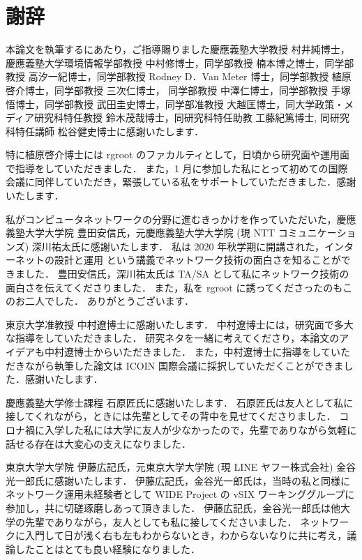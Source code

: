 \chapter*{謝辞}
\label{thanks}
本論文を執筆するにあたり，ご指導賜りました慶應義塾大学教授 村井純博士，慶應義塾大学環境情報学部教授 中村修博士，同学部教授 楠本博之博士，同学部教授 高汐一紀博士，同学部教授 Rodney D．Van Meter 博士，同学部教授 植原啓介博士，同学部教授 三次仁博士，
同学部教授 中澤仁博士，同学部教授 手塚悟博士，同学部教授 武田圭史博士，同学部准教授 大越匡博士，同大学政策・メディア研究科特任教授 鈴木茂哉博士，同研究科特任助教 工藤紀篤博士, 同研究科特任講師 松谷健史博士に感謝いたします．

特に植原啓介博士には rgroot のファカルティとして，日頃から研究面や運用面で指導をしていただきました．
また，1 月に参加した私にとって初めての国際会議に同伴していただき，緊張している私をサポートしていただきました．感謝いたします．

私がコンピュータネットワークの分野に進むきっかけを作っていただいた，慶應義塾大学大学院 豊田安信氏，元慶應義塾大学大学院 (現 NTT コミュニケーションズ) 深川祐太氏に感謝いたします．
私は 2020 年秋学期に開講された，インターネットの設計と運用 という講義でネットワーク技術の面白さを知ることができました．
豊田安信氏，深川祐太氏は TA/SA として私にネットワーク技術の面白さを伝えてくださりました．
また，私を rgroot に誘ってくださったのもこのお二人でした．
ありがとうございます．

東京大学准教授 中村遼博士に感謝いたします．
中村遼博士には，研究面で多大な指導をしていただきました．
研究ネタを一緒に考えてくださり，本論文のアイデアも中村遼博士からいただきました．
また，中村遼博士に指導をしていただきながら執筆した論文は ICOIN 国際会議に採択していただくことができました．感謝いたします．

慶應義塾大学修士課程 石原匠氏に感謝いたします．
石原匠氏は友人として私に接してくれながら，ときには先輩としてその背中を見せてくださりました．
コロナ禍に入学した私には大学に友人が少なかったので，先輩でありながら気軽に話せる存在は大変心の支えになりました．

東京大学大学院 伊藤広記氏，元東京大学大学院 (現 LINE ヤフー株式会社) 金谷光一郎氏に感謝いたします．
伊藤広記氏，金谷光一郎氏は，当時の私と同様にネットワーク運用未経験者として WIDE Project の vSIX ワーキンググループに参加し，共に切磋琢磨しあって頂きました．
伊藤広記氏，金谷光一郎氏は他大学の先輩でありながら，友人としても私に接してくださいました．
ネットワークに入門して日が浅く右も左もわからないとき，わからないなりに共に考え，議論したことはとても良い経験になりました．

